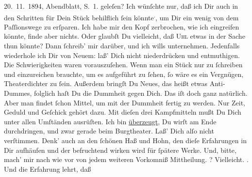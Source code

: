 \begin{ledgroupsized}[t]{13cm}
{{{                        20. 11. 1894, Abendblatt, S. 1. }}}\label{K_L02622-5h} geleſen?\pend
           \pstart
           Ich wünſchte nur, daß ich Dir auch in den Schritten für Dein Stück behilflich ſein könnte\substVorne{}\textsuperscript{.}\substDazwischen{},\substHinten{} um Dir ein wenig von dem Paſſionswege zu erſparen. Ich habe mir den Kopf
               zerbrochen, wie ich eingreifen könnte, finde aber nichts. Oder glaubſt Du vielleicht,
               daß {\pb}\textsc{Uhl} etwas in der Sache thun könnte? Dann ſchreib’ mir darüber, und ich wills
               unternehmen. Jedenfalls wiederhole ich Dir von Neuem: laß’ Dich nicht niederdrücken
               und entmuthigen. Die Schwierigkeiten waren vorauszuſehen. Wenn man ein Stück nur zu
               ſchreiben und einzureichen brauchte, um es aufgeführt zu ſehen, ſo wäre es ein
               Vergnügen, Theaterdichter zu ſein. Außerdem bringſt Du Neues, das heißt etwas
               Anti-Dummes, folglich haſt Du die Dummheit gegen Dich. Das iſt doch ganz natürlich.
               Aber man findet ſchon Mittel, {\pb}um mit der Dummheit
               fertig zu werden. Nur Zeit, Geduld und Geſchick gehört dazu. Mit dieſen drei
               Kampfmitteln \strikeout{\textcolor{gray}{we}} mußt Du Dich unter allen Umſtänden ausrüſten. Ich bin \uline{überzeugt}, Du wirſt am Ende durchdringen, und zwar gerade beim Burgtheater. Laß’ Dich alſo nicht verſtimmen.
               Denk’ auch an den ſchönen Haß und Hohn, den dieſe Erfahrungen in Dir aufhäufen und
               der befruchtend wirken wird für  ſpätere Werke.
               Und, bitte, mach’ mir nach wie vor von jedem weiteren Vorkomniß Mittheilung. \label{K_L02622-6v}\label{K_L02622-6h}? {\pb}Vielleicht. \label{K_L02622-7v}\label{K_L02622-7h}. Und die Erfahrung lehrt, daß

\end{ledgroupsized}
